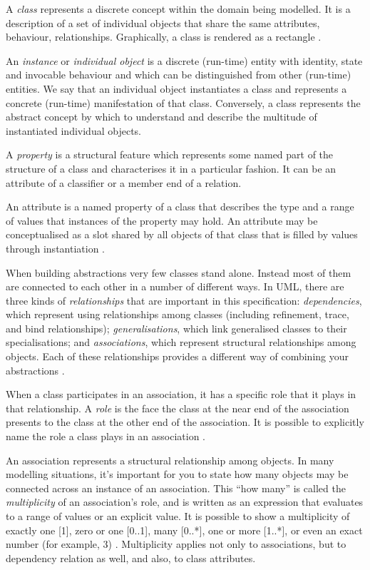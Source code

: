 	A \textit{class} represents a discrete concept within the domain being modelled. It is a description of a set of individual objects that share the same attributes, behaviour, relationships. Graphically, a class is rendered as a rectangle \cite{uml-userguide}.
	
	An \textit{instance} or \textit{individual object} is a discrete (run-time) entity with identity, state and invocable behaviour and which can be distinguished from other (run-time) entities. We say that an individual object instantiates a class and represents a concrete (run-time) manifestation of that class. Conversely, a class represents the abstract concept by which to understand and describe the multitude of instantiated individual objects. 
	
	A \textit{property} is a structural feature which represents some named part of the structure of a class and characterises it in a particular fashion. It can be an attribute of a classifier or a member end of a relation.
	
	An attribute is a named property of a class that describes the type and a range of values that instances of the property may hold. An attribute may be conceptualised as a slot  shared by all objects of that class that is filled by values through instantiation \cite{uml-userguide}.
	
	When building abstractions very few classes stand alone. Instead most of them are connected to each other in a number of different ways. In UML, there are three kinds of \textit{relationships} that are important in this specification: \textit{dependencies}, which represent using relationships among classes (including refinement, trace, and bind relationships); \textit{generalisations}, which link generalised classes to their specialisations; and \textit{associations}, which represent structural relationships among objects. Each of these relationships provides a different way of combining your abstractions \cite{uml-userguide}.
	
	When a class participates in an association, it has a specific role that it plays in that relationship. A \textit{role} is the face the class at the near end of the association presents to the class at the other end of the association. It is possible to explicitly name the role a class plays in an association \cite{uml-userguide}.  
	
	An association represents a structural relationship among objects. In many modelling situations, it's important for you to state how many objects may be connected across an instance of an association. This ``how many'' is called the \textit{multiplicity} of an association's role, and is written as an expression that evaluates to a range of values or an explicit value. It is possible to show a multiplicity of exactly one [1], zero or one [0..1], many [0..*], one or more [1..*], or even an exact number (for example, 3) \cite{uml-userguide}. Multiplicity applies not only to associations, but to dependency relation as well, and also, to class attributes.
	
